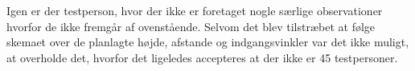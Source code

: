 %
Igen er der testperson, hvor der ikke er foretaget nogle særlige observationer hvorfor de ikke fremgår af ovenstående. Selvom det blev tilstræbet at følge skemaet over de planlagte højde, afstande og indgangsvinkler var det ikke muligt, at overholde det, hvorfor det ligeledes accepteres at der ikke er 45 testpersoner.  
